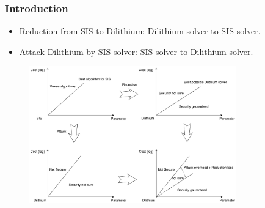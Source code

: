 \documentclass{beamer}
\begin{document}
\frame
{
  \frametitle{Introduction}

  \begin{itemize}
  	\item Reduction from SIS to Dilithium: Dilithium solver to SIS solver.
  	\item Attack Dilithium by SIS solver: SIS solver to Dilithium solver.
  \end{itemize}

  \begin{figure}[ht!]
  \includegraphics[width=0.8\textwidth]{files/SIS-Dilithium.pdf}
  \end{figure}
}

\end{document}
